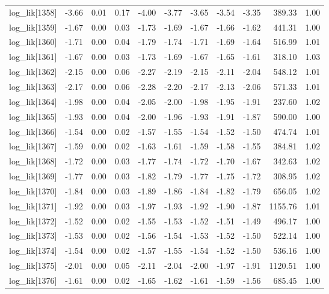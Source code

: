 \begin{table}[ht]
\begin{tabular}{rrrrrrrrrrr}
  log\_lik[1358] & -3.66 & 0.01 & 0.17 & -4.00 & -3.77 & -3.65 & -3.54 & -3.35 & 389.33 & 1.00 \\ 
  log\_lik[1359] & -1.67 & 0.00 & 0.03 & -1.73 & -1.69 & -1.67 & -1.66 & -1.62 & 441.31 & 1.00 \\ 
  log\_lik[1360] & -1.71 & 0.00 & 0.04 & -1.79 & -1.74 & -1.71 & -1.69 & -1.64 & 516.99 & 1.01 \\ 
  log\_lik[1361] & -1.67 & 0.00 & 0.03 & -1.73 & -1.69 & -1.67 & -1.65 & -1.61 & 318.10 & 1.03 \\ 
  log\_lik[1362] & -2.15 & 0.00 & 0.06 & -2.27 & -2.19 & -2.15 & -2.11 & -2.04 & 548.12 & 1.01 \\ 
  log\_lik[1363] & -2.17 & 0.00 & 0.06 & -2.28 & -2.20 & -2.17 & -2.13 & -2.06 & 571.33 & 1.01 \\ 
  log\_lik[1364] & -1.98 & 0.00 & 0.04 & -2.05 & -2.00 & -1.98 & -1.95 & -1.91 & 237.60 & 1.02 \\ 
  log\_lik[1365] & -1.93 & 0.00 & 0.04 & -2.00 & -1.96 & -1.93 & -1.91 & -1.87 & 590.00 & 1.00 \\ 
  log\_lik[1366] & -1.54 & 0.00 & 0.02 & -1.57 & -1.55 & -1.54 & -1.52 & -1.50 & 474.74 & 1.01 \\ 
  log\_lik[1367] & -1.59 & 0.00 & 0.02 & -1.63 & -1.61 & -1.59 & -1.58 & -1.55 & 384.81 & 1.02 \\ 
  log\_lik[1368] & -1.72 & 0.00 & 0.03 & -1.77 & -1.74 & -1.72 & -1.70 & -1.67 & 342.63 & 1.02 \\ 
  log\_lik[1369] & -1.77 & 0.00 & 0.03 & -1.82 & -1.79 & -1.77 & -1.75 & -1.72 & 308.95 & 1.02 \\ 
  log\_lik[1370] & -1.84 & 0.00 & 0.03 & -1.89 & -1.86 & -1.84 & -1.82 & -1.79 & 656.05 & 1.02 \\ 
  log\_lik[1371] & -1.92 & 0.00 & 0.03 & -1.97 & -1.93 & -1.92 & -1.90 & -1.87 & 1155.76 & 1.01 \\ 
  log\_lik[1372] & -1.52 & 0.00 & 0.02 & -1.55 & -1.53 & -1.52 & -1.51 & -1.49 & 496.17 & 1.00 \\ 
  log\_lik[1373] & -1.53 & 0.00 & 0.02 & -1.56 & -1.54 & -1.53 & -1.52 & -1.50 & 522.14 & 1.00 \\ 
  log\_lik[1374] & -1.54 & 0.00 & 0.02 & -1.57 & -1.55 & -1.54 & -1.52 & -1.50 & 536.16 & 1.00 \\ 
  log\_lik[1375] & -2.01 & 0.00 & 0.05 & -2.11 & -2.04 & -2.00 & -1.97 & -1.91 & 1120.51 & 1.00 \\ 
  log\_lik[1376] & -1.61 & 0.00 & 0.02 & -1.65 & -1.62 & -1.61 & -1.59 & -1.56 & 685.45 & 1.00 \\ 

\end{tabular}
\end{table}
